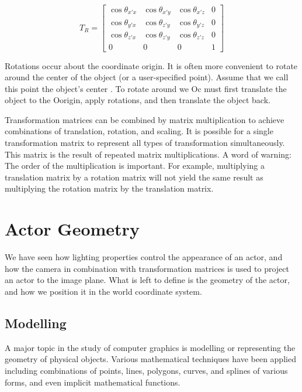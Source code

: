 \begin{equation}\label{eq:3.13}
T_R = \left[\begin{array}{cccc}
\cos\theta_{x'x} & \cos\theta_{x'y} & \cos\theta_{x'z} & 0 \\
\cos\theta_{y'x} & \cos\theta_{z'y} & \cos\theta_{y'z} & 0 \\
\cos\theta_{z'x} & \cos\theta_{z'y} & \cos\theta_{z'z} & 0 \\
0 & 0 & 0 & 1
\end{array}\right]
\end{equation}


Rotations occur about the coordinate origin. It is often more convenient to rotate around the center of the object (or a user-specified point). Assume that we call this point the object's center . To rotate around we Oc must first translate the object to the Oorigin, apply rotations, and then translate the object back.

Transformation matrices can be combined by matrix multiplication to achieve combinations of translation, rotation, and scaling. It is possible for a single transformation matrix to represent all types of transformation simultaneously. This matrix is the result of repeated matrix multiplications. A word of warning: The order of the multiplication is important. For example, multiplying a translation matrix by a rotation matrix will not yield the same result as multiplying the rotation matrix by the translation matrix.

\section{Actor Geometry}

We have seen how lighting properties control the appearance of an actor, and how the camera in combination with transformation matrices is used to project an actor to the image plane. What is left to define is the geometry of the actor, and how we position it in the world coordinate system.

\subsection{Modelling}

A major topic in the study of computer graphics is modelling or representing the geometry of physical objects. Various mathematical techniques have been applied including combinations of points, lines, polygons, curves, and splines of various forms, and even implicit mathematical functions.

